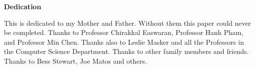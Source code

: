 \begin{center}
	
\textbf{\Large Dedication}
\end{center}

This is dedicated to my Mother and Father. Without them this paper could never be completed. Thanks to Professor Chirakkal Easwaran, Professor Hanh Pham, and Professor Min Chen. Thanks also to Leslie Masker and all the Professors in the Computer Science Department. Thanks to other family members and friends. Thanks to Bess Stewart, Joe Matos and others. 